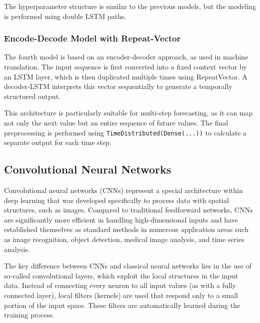 The hyperparameter structure is similar to the previous models, but the modeling is performed using double LSTM paths.



\subsubsection{Encode-Decode Model with Repeat-Vector}

The fourth model is based on an encoder-decoder approach, as used in machine translation.
The input sequence is first converted into a fixed context vector by an LSTM layer, which is then duplicated multiple times using RepeatVector.
A decoder-LSTM interprets this vector sequentially to generate a temporally structured output.

This architecture is particularly suitable for multi-step forecasting, as it can map not only the next value but an entire sequence of future values.
The final preprocessing is performed using \verb|TimeDistributed(Dense(...))| to calculate a separate output for each time step.



\subsection{Convolutional Neural Networks}

Convolutional neural networks (CNNs) represent a special architecture within deep learning that was developed specifically to process data with spatial structures, such as images.
Compared to traditional feedforward networks, CNNs are significantly more efficient in handling high-dimensional inputs and have established themselves as standard methods in numerous application areas such as image recognition, object detection, medical image analysis, and time series analysis.

The key difference between CNNs and classical neural networks lies in the use of so-called convolutional layers, which exploit the local structures in the input data.
Instead of connecting every neuron to all input values (as with a fully connected layer), local filters (kernels) are used that respond only to a small portion of the input space.
These filters are automatically learned during the training process.

